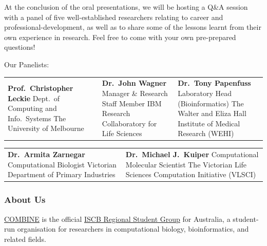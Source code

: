 \documentclass[12pt,]{article}
\begin{document}
At the conclusion of the oral presentations, we will be hosting a Q\&A
session with a panel of five well-established researchers
relating to career and professional-development, as well as to share
some of the lessons learnt from their own experience in research. Feel free
to come with your own pre-prepared questions!\par\bigskip

\begin{minipage}[c]{\linewidth}
    \centering
    Our Panelists:\\[3ex]
    \begin{tabu}{X[c]X[c]X[c]}
        \textbf{Prof.~Christopher Leckie}\linebreak
            Dept.~of Computing and Info.~Systems\linebreak
            The University of Melbourne
        & \textbf{Dr.~John Wagner}\linebreak
            Manager \& Research Staff Member\linebreak
            IBM Research Collaboratory for Life Sciences
        & \textbf{Dr.~Tony Papenfuss}\linebreak
            Laboratory Head (Bioinformatics)\linebreak
            The Walter and Eliza Hall Institute of Medical Research (WEHI)
    \end{tabu}
    \vspace{3ex}
    \begin{tabu}{X[c]X[c]}
        \textbf{Dr.~Armita Zarnegar}\linebreak
            Computational Biologist\linebreak
            Victorian Department of Primary Industries
        & \textbf{Dr.~Michael J.~Kuiper}\linebreak
            Computational Molecular Scientist\linebreak
            The Victorian Life Sciences Computation Initiative (VLSCI)
    \end{tabu}
\end{minipage}


\subsubsection{About Us}

\href{http://www.combine.org.au}{COMBINE} is the official
\href{http://www.iscbsc.org/content/regional-student-groups}{ISCB
Regional Student Group} for Australia, a student-run organisation for
researchers in computational biology, bioinformatics, and related
fields.
\end{document}
